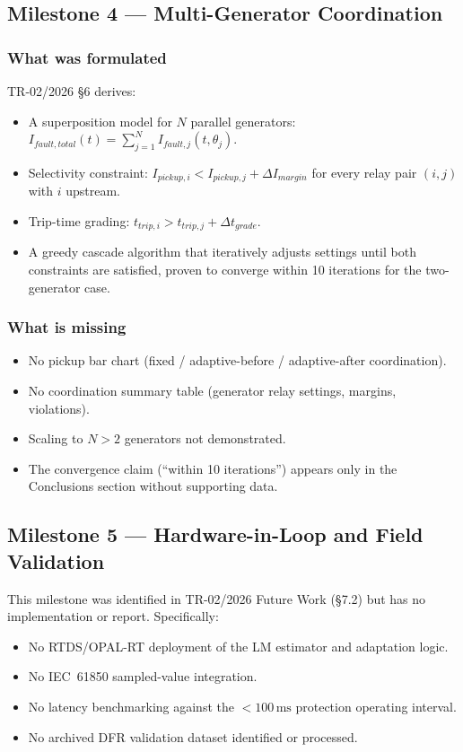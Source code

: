 \documentclass[12pt,a4paper]{article}
\newcommand{\mss}{\,\text{ms}}
\begin{document}
\subsection{Milestone 4 — Multi-Generator Coordination}
\label{sec:gap:m4}

\subsubsection{What was formulated}

TR-02/2026 \S6 derives:
\begin{itemize}
  \item A superposition model for $N$ parallel generators:
        $I_{fault,total}(t) = \sum_{j=1}^{N} I_{fault,j}(t, \theta_j)$.
  \item Selectivity constraint:
        $I_{pickup,i} < I_{pickup,j} + \Delta I_{margin}$
        for every relay pair $(i,j)$ with $i$ upstream.
  \item Trip-time grading: $t_{trip,i} > t_{trip,j} + \Delta t_{grade}$.
  \item A greedy cascade algorithm that iteratively adjusts settings until
        both constraints are satisfied, proven to converge within 10 iterations
        for the two-generator case.
\end{itemize}

\subsubsection{What is missing}
\begin{itemize}
  \item No pickup bar chart (fixed / adaptive-before / adaptive-after coordination).
  \item No coordination summary table (generator relay settings, margins, violations).
  \item Scaling to $N > 2$ generators not demonstrated.
  \item The convergence claim (``within 10 iterations'') appears only in the
        Conclusions section without supporting data.
\end{itemize}

\subsection{Milestone 5 — Hardware-in-Loop and Field Validation}
\label{sec:gap:m5}

This milestone was identified in TR-02/2026 Future Work (\S7.2) but has no
implementation or report.  Specifically:
\begin{itemize}
  \item No RTDS/OPAL-RT deployment of the LM estimator and adaptation logic.
  \item No IEC~61850 sampled-value integration.
  \item No latency benchmarking against the $<100\mss$ protection operating interval.
  \item No archived DFR validation dataset identified or processed.
\end{itemize}
\end{document}
